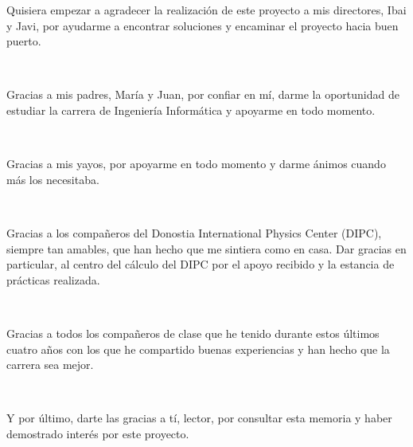 
\begin{center}
	Quisiera empezar a agradecer la realizaci\'{o}n de este proyecto a mis directores, Ibai y Javi, por ayudarme a encontrar soluciones y encaminar el proyecto hacia buen puerto.
	
	\
	
	Gracias a mis padres, Mar\'{i}a y Juan, por confiar en m\'{i}, darme la oportunidad de estudiar la carrera de Ingenier\'{i}a Inform\'{a}tica y apoyarme en todo momento.
	
	\
	
	Gracias a mis yayos, por apoyarme en todo momento y darme \'{a}nimos cuando m\'{a}s los necesitaba.
	
	\
	
	Gracias a los compa\~{n}eros del Donostia International Physics Center (DIPC), siempre tan amables, que han hecho que me sintiera como en casa. Dar gracias en particular, al centro del c\'{a}lculo del DIPC por el apoyo recibido y la estancia de pr\'{a}cticas realizada.
	
	\
	
	Gracias a todos los compa\~{n}eros de clase que he tenido durante estos \'{u}ltimos cuatro a\~{n}os con los que he compartido buenas experiencias y han hecho que la carrera sea mejor.
	
	\
	
	Y por \'{u}ltimo, darte las gracias a t\'{i}, lector, por consultar esta memoria y haber demostrado inter\'{e}s por este proyecto.
\end{center}